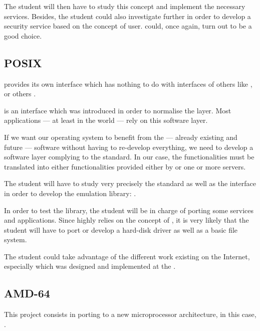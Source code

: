 \begin{multicols}{2}
The student will then have to study this concept and implement the necessary
services. Besides, the student could also investigate further in order
to develop a security service based on the concept of user. 
could, once again, turn out to be a good choice.

%
%

\subsection{POSIX}

 provides its own interface which has nothing to do with interfaces
of others  like ,  or others \etc{}.

 is an interface which was introduced in order to normalise the
 layer. Most applications --- at least in the 
world --- rely on this software layer.

If we want our operating system to benefit from the --- already existing and
future --- software without having to re-develop everything, we need to
develop a software layer complying to the  standard. In our case,
the  functionalities must be translated into either
functionalities provided either by  or one or more  servers.

The student will have to study very precisely the  standard
as well as the  interface in order to develop the emulation library:
.

In order to test the library, the student will be in charge of porting some
services and applications. Since  highly relies on the concept
of , it is very likely that the student will have to port
or develop a hard-disk driver as well as a basic file system.

The student could take advantage of the different work existing on the
Internet, especially  which was designed and implemented
at the .

%
%

\subsection{AMD-64}

This project consists in porting  to a new microprocessor architecture,
in this case, .


\end{multicols}
